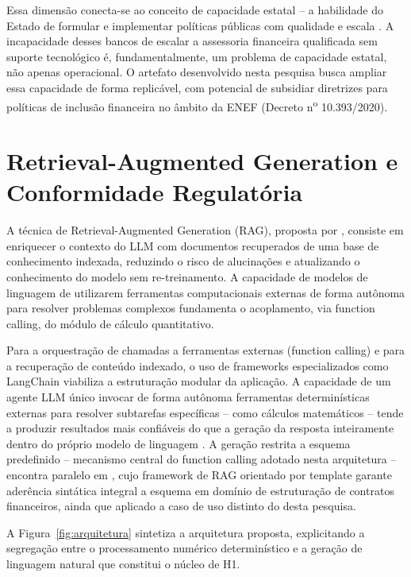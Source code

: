 Essa dimens\~ao conecta-se ao conceito de capacidade estatal -- a
habilidade do Estado de formular e implementar pol\'iticas p\'ublicas com
qualidade e escala \autocite{evansrauch1999}. A incapacidade desses
bancos de escalar a assessoria financeira qualificada sem suporte tecnol\'ogico \'e,
fundamentalmente, um problema de capacidade estatal, n\~ao apenas
operacional. O artefato desenvolvido nesta pesquisa busca ampliar essa
capacidade de forma replic\'avel, com potencial de subsidiar diretrizes
para pol\'iticas de inclus\~ao financeira no \^ambito da ENEF (Decreto
n\textsuperscript{o} 10.393/2020).

\section{Retrieval-Augmented Generation e Conformidade Regulat\'oria}
\label{sec:rag}

A t\'ecnica de Retrieval-Augmented Generation (RAG), proposta por
\textcite{lewis2020}, consiste em enriquecer o contexto do LLM com
documentos recuperados de uma base de conhecimento indexada, reduzindo o
risco de alucina\c{c}\~oes e atualizando o conhecimento do modelo sem
re-treinamento. A capacidade de modelos de linguagem de utilizarem
ferramentas computacionais externas de forma aut\^onoma para resolver
problemas complexos \autocite{schick2023} fundamenta o acoplamento, via
function calling, do m\'odulo de c\'alculo quantitativo.

Para a orquestra\c{c}\~ao de chamadas a ferramentas externas (function
calling) e para a recupera\c{c}\~ao de conte\'udo indexado, o uso de
frameworks especializados como LangChain \autocite{chase2023} viabiliza a
estrutura\c{c}\~ao modular da aplica\c{c}\~ao. A capacidade de um agente
LLM \'unico invocar de forma aut\^onoma ferramentas determin\'isticas
externas para resolver subtarefas espec\'ificas -- como c\'alculos
matem\'aticos -- tende a produzir resultados mais confi\'aveis do que a
gera\c{c}\~ao da resposta inteiramente dentro do pr\'oprio modelo de
linguagem \autocite{schick2023}. A gera\c{c}\~ao restrita a esquema
predefinido -- mecanismo central do function calling adotado nesta
arquitetura -- encontra paralelo em \textcite{mridul2025}, cujo framework
de RAG orientado por template garante ader\^encia sint\'atica integral a
esquema em dom\'inio de estrutura\c{c}\~ao de contratos financeiros, ainda
que aplicado a caso de uso distinto do desta pesquisa.

A Figura~\ref{fig:arquitetura} sintetiza a arquitetura proposta,
explicitando a segrega\c{c}\~ao entre o processamento num\'erico
determin\'istico e a gera\c{c}\~ao de linguagem natural que constitui o
n\'ucleo de H1.

